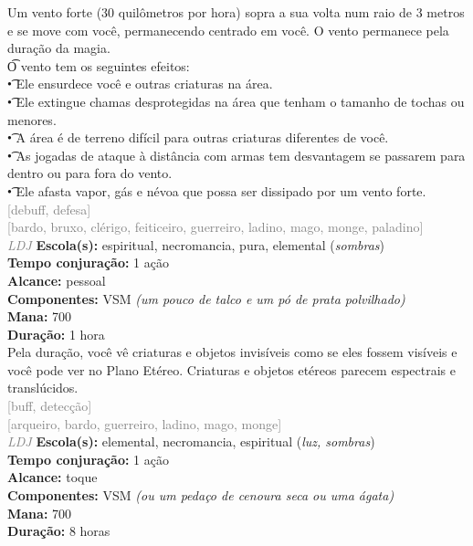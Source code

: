 \documentclass{RPG_Adventure}[2021/10/20]
\begin{document}
{\normalsize Um vento forte (30 quilômetros por hora) sopra a sua volta num raio de 3 metros e se move com você, permanecendo centrado em você. O vento permanece pela duração da magia.\\\t O vento tem os seguintes efeitos:\\\t • Ele ensurdece você e outras criaturas na área.\\\t • Ele extingue chamas desprotegidas na área que tenham o tamanho de tochas ou menores.\\\t • A área é de terreno difícil para outras criaturas diferentes de você.\\\t • As jogadas de ataque à distância com armas tem desvantagem se passarem para dentro ou para fora do vento.\\\t • Ele afasta vapor, gás e névoa que possa ser dissipado por um vento forte.\\}
{\scriptsize \textcolor{gray}{[debuff, defesa]\\}}
{\scriptsize \textcolor{gray}{[bardo, bruxo, clérigo, feiticeiro, guerreiro, ladino, mago, monge, paladino]\\}}
{\tiny \textcolor{gray}{\textit{LDJ}}}
{\small \t \textbf{Escola(s):} espiritual, necromancia, pura, elemental (\textit{sombras})\\\t \textbf{Tempo conjuração:} 1 ação\\\t \textbf{Alcance:} pessoal\\\t \textbf{Componentes:} VSM \textit{(um pouco de talco e um pó de prata polvilhado)}\\\t \textbf{Mana:} 700\\\t \textbf{Duração:} 1 hora\\}
{\normalsize Pela duração, você vê criaturas e objetos invisíveis como se eles fossem visíveis e você pode ver no Plano Etéreo. Criaturas e objetos etéreos parecem espectrais e translúcidos.\\}
{\scriptsize \textcolor{gray}{[buff, detecção]\\}}
{\scriptsize \textcolor{gray}{[arqueiro, bardo, guerreiro, ladino, mago, monge]\\}}
{\tiny \textcolor{gray}{\textit{LDJ}}}
{\small \t \textbf{Escola(s):} elemental, necromancia, espiritual (\textit{luz, sombras})\\\t \textbf{Tempo conjuração:} 1 ação\\\t \textbf{Alcance:} toque\\\t \textbf{Componentes:} VSM \textit{(ou um pedaço de cenoura seca ou uma ágata)}\\\t \textbf{Mana:} 700\\\t \textbf{Duração:} 8 horas\\}
\end{document}
